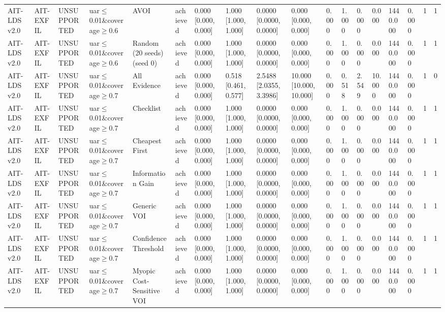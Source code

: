 \begin{table}[!ht]
{\begin{tabular}{llllllllllllllllll}
AIT-LDS v2.0 & AIT-EXFIL & UNSUPPORTED & uar$\le$0.01\&coverage$\ge$0.6 & AVOI & achieved & 0.000 [0.000, 0.000] & 1.000 [1.000, 1.000] & 0.0000 [0.0000, 0.0000] & 0.000 [0.000, 0.000] & 0.000 & 1.000 & 0.000 & 0.000 & 1440.000 & 0.000 & 1 & 1 \\
AIT-LDS v2.0 & AIT-EXFIL & UNSUPPORTED & uar$\le$0.01\&coverage$\ge$0.6 & Random (20 seeds) (seed 0) & achieved & 0.000 [0.000, 0.000] & 1.000 [1.000, 1.000] & 0.0000 [0.0000, 0.0000] & 0.000 [0.000, 0.000] & 0.000 & 1.000 & 0.000 & 0.000 & 1440.000 & 0.000 & 1 & 1 \\
AIT-LDS v2.0 & AIT-EXFIL & UNSUPPORTED & uar$\le$0.01\&coverage$\ge$0.7 & All Evidence & achieved & 0.000 [0.000, 0.000] & 0.518 [0.461, 0.577] & 2.5488 [2.0355, 3.3986] & 10.000 [10.000, 10.000] & 0.000 & 0.518 & 2.549 & 10.000 & 1440.000 & 0.000 & 1 & 0 \\
AIT-LDS v2.0 & AIT-EXFIL & UNSUPPORTED & uar$\le$0.01\&coverage$\ge$0.7 & Checklist & achieved & 0.000 [0.000, 0.000] & 1.000 [1.000, 1.000] & 0.0000 [0.0000, 0.0000] & 0.000 [0.000, 0.000] & 0.000 & 1.000 & 0.000 & 0.000 & 1440.000 & 0.000 & 1 & 1 \\
AIT-LDS v2.0 & AIT-EXFIL & UNSUPPORTED & uar$\le$0.01\&coverage$\ge$0.7 & Cheapest First & achieved & 0.000 [0.000, 0.000] & 1.000 [1.000, 1.000] & 0.0000 [0.0000, 0.0000] & 0.000 [0.000, 0.000] & 0.000 & 1.000 & 0.000 & 0.000 & 1440.000 & 0.000 & 1 & 1 \\
AIT-LDS v2.0 & AIT-EXFIL & UNSUPPORTED & uar$\le$0.01\&coverage$\ge$0.7 & Information Gain & achieved & 0.000 [0.000, 0.000] & 1.000 [1.000, 1.000] & 0.0000 [0.0000, 0.0000] & 0.000 [0.000, 0.000] & 0.000 & 1.000 & 0.000 & 0.000 & 1440.000 & 0.000 & 1 & 1 \\
AIT-LDS v2.0 & AIT-EXFIL & UNSUPPORTED & uar$\le$0.01\&coverage$\ge$0.7 & Generic VOI & achieved & 0.000 [0.000, 0.000] & 1.000 [1.000, 1.000] & 0.0000 [0.0000, 0.0000] & 0.000 [0.000, 0.000] & 0.000 & 1.000 & 0.000 & 0.000 & 1440.000 & 0.000 & 1 & 1 \\
AIT-LDS v2.0 & AIT-EXFIL & UNSUPPORTED & uar$\le$0.01\&coverage$\ge$0.7 & Confidence Threshold & achieved & 0.000 [0.000, 0.000] & 1.000 [1.000, 1.000] & 0.0000 [0.0000, 0.0000] & 0.000 [0.000, 0.000] & 0.000 & 1.000 & 0.000 & 0.000 & 1440.000 & 0.000 & 1 & 1 \\
AIT-LDS v2.0 & AIT-EXFIL & UNSUPPORTED & uar$\le$0.01\&coverage$\ge$0.7 & Myopic Cost-Sensitive VOI & achieved & 0.000 [0.000, 0.000] & 1.000 [1.000, 1.000] & 0.0000 [0.0000, 0.0000] & 0.000 [0.000, 0.000] & 0.000 & 1.000 & 0.000 & 0.000 & 1440.000 & 0.000 & 1 & 1 \\

\end{tabular}}
\end{table}
